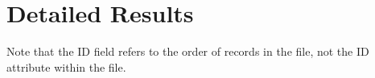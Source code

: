\documentclass[11pt, a4paper]{article}
\begin{document}
\newpage
\appendix
\section{Detailed Results} %
\label{sec:detailed_results}
Note that the ID field refers to the order of records in the file, not the ID
attribute within the file.





 
\end{document}
